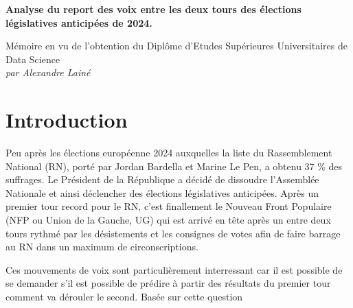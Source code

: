 \documentclass[11pt]{article}
\begin{document}
    

    \pagestyle{fancy}
    \fancyfoot{}
    \vspace{5cm}

    \begin{center}
        \Large \textbf{Analyse du report des voix entre les deux tours des élections législatives anticipées de 2024.}
    \end{center}
    
    \vspace{2cm}
    
    \begin{center}
        Mémoire en vu de l'obtention du Diplôme d'Etudes Supérieures Universitaires de Data Science \\
        \textit{par Alexandre Lainé}
    \end{center}

    \newpage
    \pagestyle{fancy}
    \fancyhead{} %
    \fancyfoot{} %
    \fancyfoot[R]{\thepage}

    \section*{Introduction}

    Peu après les élections européenne 2024 auxquelles la liste du Rassemblement National (RN), porté par Jordan Bardella et Marine Le Pen, a obtenu 37 \% des suffrages. Le Président de la République a décidé de dissoudre l'Assemblée Nationale et ainsi déclencher des élections législatives anticipées. Après un premier tour record pour le RN, c'est finallement le Nouveau Front Populaire (NFP ou Union de la Gauche, UG) qui est arrivé en tête après un entre deux tours rythmé par les désistements et les consignes de votes afin de faire barrage au RN dans un maximum de circonscriptions. 

    Ces mouvements de voix sont particulièrement interressant car il est possible de se demander s'il est possible de prédire à partir des résultats du premier tour comment va dérouler le second. Basée sur cette question
    
    \newpage
\end{document}
